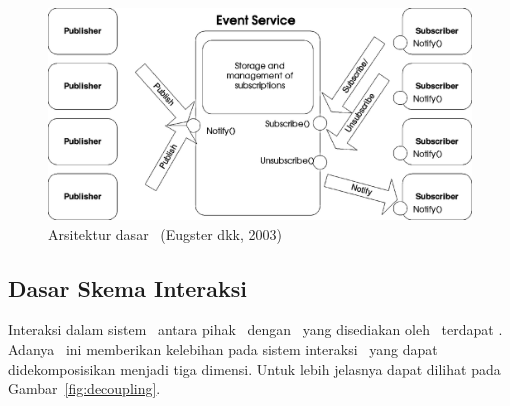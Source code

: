 \begin{figure}
    \centering
    \includegraphics[scale=0.20]
    {images/2-arsitektur-pub-sub.png}
    \caption{Arsitektur dasar \pubsub~(Eugster dkk, 2003)}
\label{fig:arsitektur}
\end{figure}

\subsection{Dasar Skema Interaksi \PubSub}

Interaksi dalam sistem \pubsub~antara pihak \publisher~dengan \subscriber~yang
disediakan oleh \eventservice~terdapat \decoupling. Adanya \decoupling~ini
memberikan kelebihan pada sistem interaksi \pubsub~yang dapat didekomposisikan
menjadi tiga dimensi.  Untuk lebih jelasnya dapat dilihat pada
Gambar~\ref{fig:decoupling}.

